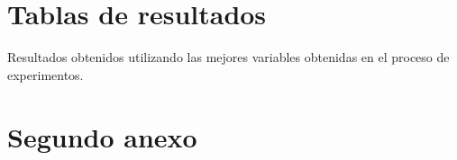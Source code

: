\chapter{Tablas de resultados}
\label{ch:anexo-a}

\begin{table}[tb]
	\centering
	\caption{Resultados obtenidos utilizando las mejores variables obtenidas en el proceso de experimentos.}
	\label{tabla:exp:accuracy_general}
\end{table}



\chapter{Segundo anexo}
\label{ch:anexo-b}




